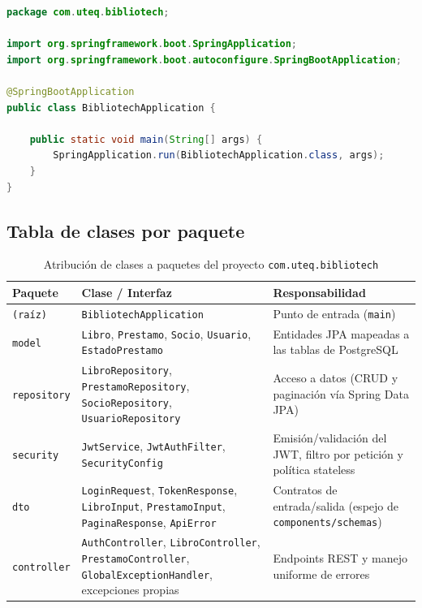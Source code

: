 \documentclass[11pt,a4paper]{article}
\begin{document}
\begin{lstlisting}[language=java,caption={\texttt{BibliotechApplication.java} --- clase principal con main() completo}]
package com.uteq.bibliotech;

import org.springframework.boot.SpringApplication;
import org.springframework.boot.autoconfigure.SpringBootApplication;

@SpringBootApplication
public class BibliotechApplication {

    public static void main(String[] args) {
        SpringApplication.run(BibliotechApplication.class, args);
    }
}
\end{lstlisting}

\subsection{Tabla de clases por paquete}

\begin{table}[h!]
\centering
\caption{Atribución de clases a paquetes del proyecto \texttt{com.uteq.bibliotech}}
\small
\begin{tabular}{l l p{7.0cm}}
\toprule
\textbf{Paquete} & \textbf{Clase / Interfaz} & \textbf{Responsabilidad} \\
\midrule
\texttt{(raíz)} & \texttt{BibliotechApplication} & Punto de entrada (\texttt{main}) \\
\texttt{model} & \texttt{Libro}, \texttt{Prestamo}, \texttt{Socio}, \texttt{Usuario}, \texttt{EstadoPrestamo} & Entidades JPA mapeadas a las tablas de PostgreSQL \\
\texttt{repository} & \texttt{LibroRepository}, \texttt{PrestamoRepository}, \texttt{SocioRepository}, \texttt{UsuarioRepository} & Acceso a datos (CRUD y paginación vía Spring Data JPA) \\
\texttt{security} & \texttt{JwtService}, \texttt{JwtAuthFilter}, \texttt{SecurityConfig} & Emisión/validación del JWT, filtro por petición y política stateless \\
\texttt{dto} & \texttt{LoginRequest}, \texttt{TokenResponse}, \texttt{LibroInput}, \texttt{PrestamoInput}, \texttt{PaginaResponse}, \texttt{ApiError} & Contratos de entrada/salida (espejo de \texttt{components/schemas}) \\
\texttt{controller} & \texttt{AuthController}, \texttt{LibroController}, \texttt{PrestamoController}, \texttt{GlobalExceptionHandler}, excepciones propias & Endpoints REST y manejo uniforme de errores \\
\bottomrule
\end{tabular}
\end{table}
\end{document}
